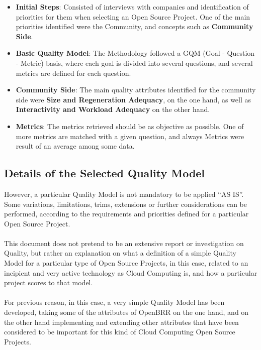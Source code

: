 \documentclass[11pt]{article}
\begin{document}
\begin{itemize}
\begin{itemize}
\begin{itemize}\itemsep0pt
\item{\textbf{Initial Steps}}: Consisted of interviews with companies and identification of priorities for them when selecting an Open Source Project. One of the main priorities identified were the Community, and concepts such as \textbf{Community Side}.
\item{\textbf{Basic Quality Model}}: The Methodology followed a GQM (Goal - Question - Metric) basis, where each goal  is divided into several questions, and several metrics are defined for each question.
\item{\textbf{Community Side}}: The main quality attributes identified for the community side were \textbf{Size and Regeneration Adequacy}, on the one hand, as well as \textbf{Interactivity and Workload Adequacy} on the other hand. 
\item{\textbf{Metrics}}: The metrics retrieved should be as objective as possible. One of more metrics are matched with a given question, and always Metrics were result of an average among some data. 
\end{itemize}

\end{itemize}
\end{itemize}

\subsection{Details of the Selected Quality Model}\label{sec:quality_model}
However, a particular Quality Model is not mandatory to be applied ``AS IS''. Some variations, limitations, trims, extensions or further considerations can be performed, according to the requirements and priorities defined for a particular Open Source Project.\\
\\
This document does not pretend to be an extensive report or investigation on Quality, but rather an explanation on what a definition of a simple Quality Model for a particular type of Open Source Projects, in this case, related to an incipient and very active technology as Cloud Computing is, and how a particular project scores to that model.\\
\\
For previous reason, in this case, a very simple Quality Model has been developed, taking some of the attributes of OpenBRR on the one hand, and on the other hand implementing and extending other attributes that have been considered to be important for this kind of Cloud Computing Open Source Projects.
\end{document}
